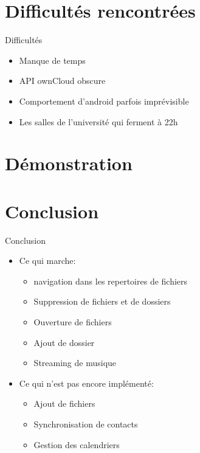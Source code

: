 \documentclass{beamer}
\begin{document}




\section{Difficultés rencontrées}
\begin{frame}{Difficultés}
	\begin{itemize}
	\item Manque de temps
	\item API ownCloud obscure
	\item Comportement d'android parfois imprévisible
	\item Les salles de l'université qui ferment à 22h
	\end{itemize}
	\end{frame}


\section{Démonstration}

\section{Conclusion}
	\begin{frame}{Conclusion}
	\begin{itemize}
	\item Ce qui marche:
		\begin{itemize}
		\item navigation dans les repertoires de fichiers
		\item Suppression de fichiers et de dossiers
		\item Ouverture de fichiers
		\item Ajout de dossier 
		\pause
		\item Streaming de musique
		\end{itemize}
	\pause
	\item Ce qui n'est pas encore implémenté:
		\begin{itemize}
		\item Ajout de fichiers
		\item Synchronisation de contacts
		\item Gestion des calendriers

		\end{itemize}
	\end{itemize}
	\end{frame}
\end{document}

